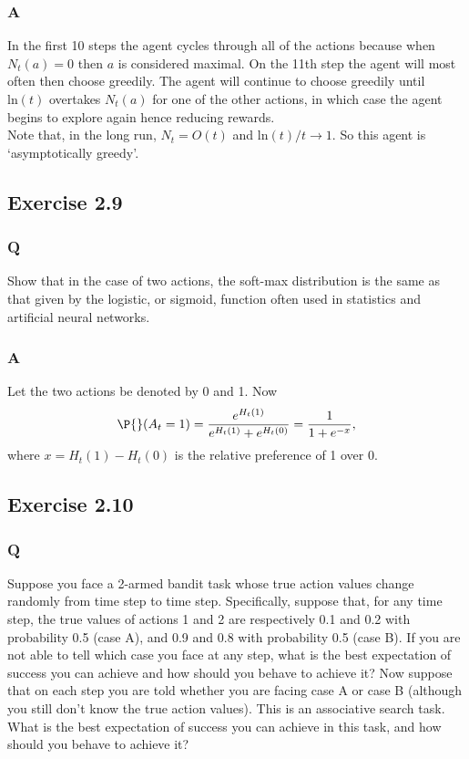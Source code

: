 \subsubsection*{A}
In the first 10 steps the agent cycles through all of the actions because when $N_t(a) = 0$ then $a$ is considered maximal. On the 11th step the agent will most often then choose greedily. The agent will continue to choose greedily until $\mathrm{ln}(t)$ overtakes $N_t(a)$ for one of the other actions, in which case the agent begins to explore again hence reducing rewards.\\

Note that, in the long run, $N_t = O(t)$ and $\mathrm{ln}(t) / t \to 1$. So this agent is `asymptotically greedy'.


\subsection{Exercise 2.9}
\subsubsection*{Q}
Show that in the case of two actions, the soft-max distribution is the same as that given by the logistic, or sigmoid, function often used in statistics and artificial neural networks.

\subsubsection*{A}
Let the two actions be denoted by 0 and 1. Now
\begin{equation}
    \P{}(A_t = 1) = \frac{e^{H_t(1)}}{e^{H_t(1)} + e^{H_t(0)}} = \frac{1}{1 + e^{-x}}, 
\end{equation}
where $x = H_t(1) - H_t(0)$ is the relative preference of 1 over 0.

\subsection{Exercise 2.10}
\subsubsection*{Q}
Suppose you face a 2-armed bandit task whose true action values change randomly from time step to time step. Specifically, suppose that, for any time step, the true values of actions 1 and 2 are respectively 0.1 and 0.2 with probability 0.5 (case A), and 0.9 and 0.8 with probability 0.5 (case B). If you are not able to tell which case you face at any step, what is the best expectation of success you can achieve and how should you behave to achieve it? Now suppose that on each step you are told whether you are facing case A or case B (although you still don’t know the true action values). This is an associative search task. What is the best expectation of success you can achieve in this task, and how should you behave to achieve it?

